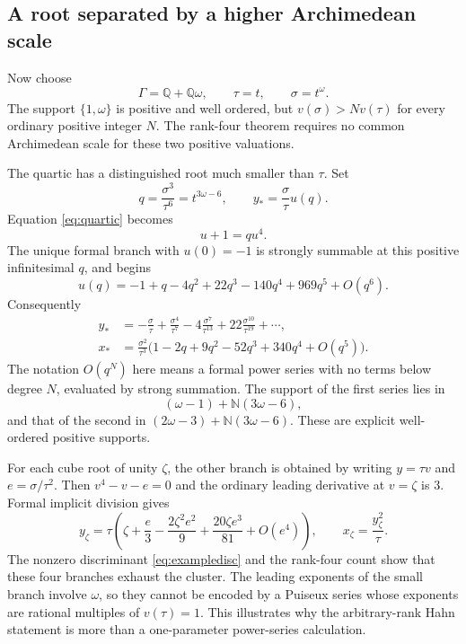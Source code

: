 \documentclass[11pt,letterpaper]{article}
\theoremstyle{definition}
\theoremstyle{remark}
\newcommand{\N}{\mathbb N}
\newcommand{\Q}{\mathbb Q}
\begin{document}
\subsection{A root separated by a higher Archimedean scale}
Now choose
\[
 \Gamma=\Q+\Q\omega,\qquad \tau=t,\qquad\sigma=t^\omega.
\]
The support $\{1,\omega\}$ is positive and well ordered, but $v(\sigma)>Nv(\tau)$ for every ordinary positive integer $N$. The rank-four theorem requires no common Archimedean scale for these two positive valuations.

The quartic has a distinguished root much smaller than $\tau$. Set
\[
 q=\frac{\sigma^3}{\tau^6}=t^{3\omega-6},\qquad
 y_* =\frac{\sigma}{\tau}u(q).
\]
Equation \eqref{eq:quartic} becomes
\[
 u+1=q u^4.
\]
The unique formal branch with $u(0)=-1$ is strongly summable at this positive infinitesimal $q$, and begins
\begin{equation}\label{eq:usmall}
 u(q)=-1+q-4q^2+22q^3-140q^4+969q^5+O(q^6).
\end{equation}
Consequently
\begin{align}
 y_*&=-\frac{\sigma}{\tau}
       +\frac{\sigma^4}{\tau^7}
       -4\frac{\sigma^7}{\tau^{13}}
       +22\frac{\sigma^{10}}{\tau^{19}}+\cdots,
       \label{eq:ysmall}\\
 x_*&=\frac{\sigma^2}{\tau^3}
       \bigl(1-2q+9q^2-52q^3+340q^4+O(q^5)\bigr).
       \label{eq:xsmall}
\end{align}
The notation $O(q^N)$ here means a formal power series with no terms below degree $N$, evaluated by strong summation. The support of the first series lies in
\[
 (\omega-1)+\N(3\omega-6),
\]
and that of the second in $(2\omega-3)+\N(3\omega-6)$. These are explicit well-ordered positive supports.

For each cube root of unity $\zeta$, the other branch is obtained by writing $y=\tau v$ and $e=\sigma/\tau^2$. Then $v^4-v-e=0$ and the ordinary leading derivative at $v=\zeta$ is $3$. Formal implicit division gives
\[
 y_\zeta=\tau\left(\zeta+\frac{e}{3}
                  -\frac{2\zeta^2e^2}{9}
                  +\frac{20\zeta e^3}{81}+O(e^4)\right),
 \qquad x_\zeta=\frac{y_\zeta^2}{\tau}.
\]
The nonzero discriminant \eqref{eq:exampledisc} and the rank-four count show that these four branches exhaust the cluster. The leading exponents of the small branch involve $\omega$, so they cannot be encoded by a Puiseux series whose exponents are rational multiples of $v(\tau)=1$. This illustrates why the arbitrary-rank Hahn statement is more than a one-parameter power-series calculation.
\end{document}
